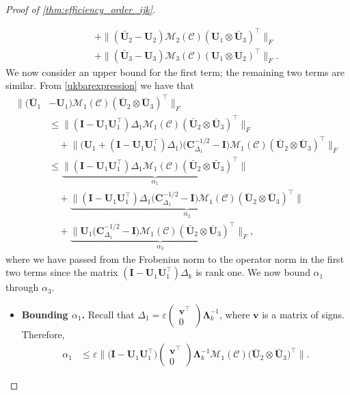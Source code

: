 \documentclass[10pt]{article}
\newcommand{\0}{{\mathbf{0}}}
\newcommand{\1}{{\mathbf{1}}}
\newcommand{\I}{{\mathbf{I}}}
\newcommand{\U}{{\mathbf{U}}}
\renewcommand{\t}{^{\top}}
\newcommand{\eps}{\varepsilon}
\newcommand{\inv}{^{-1}}
\begin{document}
\begin{proof}[Proof of \cref{thm:efficiency_order_ijk}]
\begin{itemize}
\begin{align*}
    &\quad + \| (\mathbf{\bar U}_2 - \U_2) \mathcal{M}_2(\mathcal{C}) (\mathbf{ U}_1 \otimes \mathbf{\bar U}_3)\t \|_F \\
     &\quad +  \| (\mathbf{\bar U}_3 - \U_3) \mathcal{M}_3(\mathcal{C}) (\mathbf{ U}_1 \otimes \mathbf{ U}_2)\t \|_F.
\end{align*}
We now consider an upper bound for the first term; the remaining two terms are similar.  From \eqref{ukbarexpression} we have that
\begin{align*}
    \| (\mathbf{\bar U}_1 &- \U_1) \mathcal{M}_1(\mathcal{C}) (\mathbf{\bar U}_2 \otimes \mathbf{\bar U}_3)\t \|_F \\
    &\leq  \| (\I - \U_1 \U_1\t )\Delta_1 \mathcal{M}_1(\mathcal{C}) (\mathbf{\bar U}_2 \otimes \mathbf{\bar U}_3)\t \|_F \\
    &\quad + \bigg\|\bigg(\U_1+  (\I - \U_1 \U_1\t )\Delta_1 \bigg) \bigg( \mathbf{C}_{\Delta_1}^{-1/2}- \I\bigg) \mathcal{M}_1(\mathcal{C}) (\mathbf{\bar U}_2 \otimes \mathbf{\bar U}_3)\t \bigg\|_F \\
    &\leq \underbrace{\| (\I - \U_1 \U_1\t )\Delta_1 \mathcal{M}_1(\mathcal{C}) (\mathbf{\bar U}_2 \otimes \mathbf{\bar U}_3)\t \|}_{\alpha_1} \\
    &\quad + \underbrace{\bigg\|  (\I - \U_1 \U_1\t )\Delta_1 \bigg( \mathbf{C}_{\Delta_1}^{-1/2}- \I\bigg) \mathcal{M}_1(\mathcal{C}) (\mathbf{\bar U}_2 \otimes \mathbf{\bar U}_3)\t \bigg\|}_{\alpha_2} \\
    &\quad + \underbrace{\bigg\|  \U_1  \bigg( \mathbf{C}_{\Delta_1}^{-1/2}- \I\bigg) \mathcal{M}_1(\mathcal{C}) (\mathbf{\bar U}_2 \otimes \mathbf{\bar U}_3)\t \bigg\|_F}_{\alpha_3},
\end{align*}
where we have passed from the Frobenius norm to the operator norm in the first two terms since the matrix $(\mathbf{I} - \U_1 \U_1\t)\Delta_k$ is rank one.  We now bound $\alpha_1$ through $\alpha_3$.
\begin{itemize}
    \item \textbf{Bounding $\alpha_1$.} Recall that $\Delta_1 = \eps \begin{pmatrix} \mathbf{v}\t \\ 0 \end{pmatrix} \mathbf{\Lambda}_k\inv$, where $\mathbf{v}$ is a matrix of signs.  Therefore,
    \begin{align*}
        \alpha_1 &\leq \eps \| \big( \I - \U_1 \U_1\t \big) \begin{pmatrix} \mathbf{v}\t \\ 0 \end{pmatrix} \mathbf{\Lambda}_k\inv \mathcal{M}_1(\mathcal{C}) \big( \mathbf{\bar U}_2 \otimes \mathbf{\bar U}_3\big)\t \|.

\end{align*}
\end{itemize}
\end{itemize}
\end{proof}
\end{document}
